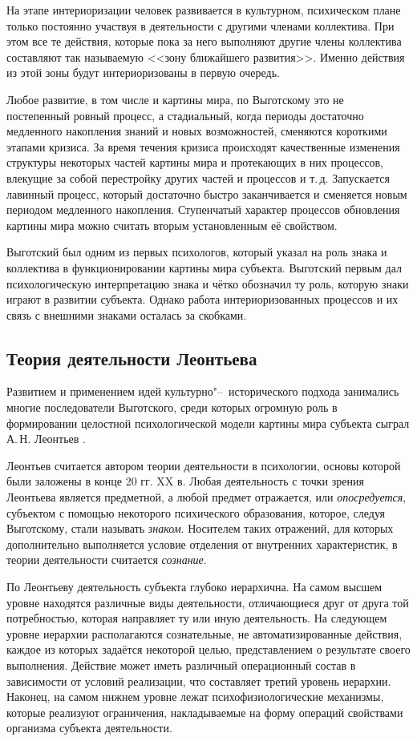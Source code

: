 На этапе интериоризации человек развивается в культурном, психическом плане только постоянно участвуя в деятельности с другими членами коллектива. При этом все те действия, которые пока за него выполняют другие члены коллектива составляют так называемую <<зону ближайшего развития>>. Именно действия из этой зоны будут интериоризованы в первую очередь.

Любое развитие, в том числе и картины мира, по Выготскому это не постепенный ровный процесс, а стадиальный, когда периоды достаточно медленного накопления знаний и новых возможностей, сменяются короткими этапами кризиса. За время течения кризиса происходят качественные изменения структуры некоторых частей картины мира и протекающих в них процессов, влекущие за собой перестройку других частей и процессов и т.\,д. Запускается лавинный процесс, который достаточно быстро заканчивается и сменяется новым периодом медленного накопления. Ступенчатый характер процессов обновления картины мира можно считать вторым установленным её свойством.

Выготский был одним из первых психологов, который указал на роль знака и коллектива в функционировании картины мира субъекта. Выготский первым дал психологическую интерпретацию знака и чётко обозначил ту роль, которую знаки играют в развитии субъекта. Однако работа интериоризованных процессов и их связь с внешними знаками осталась за скобками.

\subsection{Теория деятельности Леонтьева}

Развитием и применением идей культурно"--~исторического подхода занимались многие последователи Выготского, среди которых огромную роль в формировании целостной психологической модели картины мира субъекта сыграл А.\,Н. Леонтьев \cite{Leontiev1975}.

Леонтьев считается автором теории деятельности в психологии, основы которой были заложены в конце 20 гг. XX в. Любая деятельность с точки зрения Леонтьева является предметной, а любой предмет отражается, или \textit{опосредуется}, субъектом с помощью некоторого психического образования, которое, следуя Выготскому, стали называть \textit{знаком}. Носителем таких отражений, для которых дополнительно выполняется условие отделения от внутренних характеристик, в теории деятельности считается \textit{сознание}.

По Леонтьеву деятельность субъекта глубоко иерархична. На самом высшем уровне находятся различные виды деятельности, отличающиеся друг от друга той потребностью, которая направляет ту или иную деятельность. На следующем уровне иерархии располагаются сознательные, не автоматизированные действия, каждое из которых задаётся некоторой целью, представлением о результате своего выполнения. Действие может иметь различный операционный состав в зависимости от условий реализации, что составляет третий уровень иерархии. Наконец, на самом нижнем уровне лежат психофизиологические механизмы, которые реализуют ограничения, накладываемые на форму операций свойствами организма субъекта деятельности.

